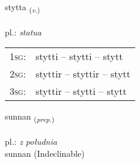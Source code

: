 \documentclass[frontgrid, backgrid]{flacards}\usepackage[]{graphicx}\usepackage[]{xcolor}
\begin{document}
\renewcommand{\flhead}{\vskip5pt \fboxsep=0pt {\small\bfseries\footnotesize Sagnorð | Verb}}
\renewcommand{\fcfoot}{\vskip5pt \fboxsep=0pt \hspace{2pt}{\small\bfseries\footnotesize 2K}}

\renewcommand{\blhead}{\vskip5pt {\small\bfseries\footnotesize Sagnorð | Verb }}
\renewcommand{\bcfoot}{\vskip5pt \hspace{2pt}{\small\bfseries\footnotesize 2K}}


{stytta \small{\textsubscript{(\textit{v.})}} \\[1ex] %
\textphonetic{[stɪhta]} \\
pl.: \emph{statua} \\  [2ex]
\renewcommand*{\arraystretch}{0.8}
\begin{tabular}{p{1cm}l}
\textsc{1sg}: & stytti -- stytti -- stytt \\ 
\textsc{2sg}: & styttir -- styttir -- stytt \\ 
\textsc{3sg}: & styttir -- stytti -- stytt \\ 
\end{tabular}
}


\renewcommand{\flhead}{\vskip5pt \fboxsep=0pt {\small\bfseries\footnotesize Forsetning | Preposition}}
\renewcommand{\fcfoot}{\vskip5pt \fboxsep=0pt \hspace{2pt}{\small\bfseries\footnotesize 2K}}

\renewcommand{\blhead}{\vskip5pt {\small\bfseries\footnotesize Forsetning | Preposition }}
\renewcommand{\bcfoot}{\vskip5pt \hspace{2pt}{\small\bfseries\footnotesize 2K}}


{sunnan \small{\textsubscript{(\textit{prep.})}} \\[1ex]
\textphonetic{[sʏnan]} \\
pl.: \emph{z południa} \\  [2ex]
sunnan (Indeclinable)}
\end{document}

